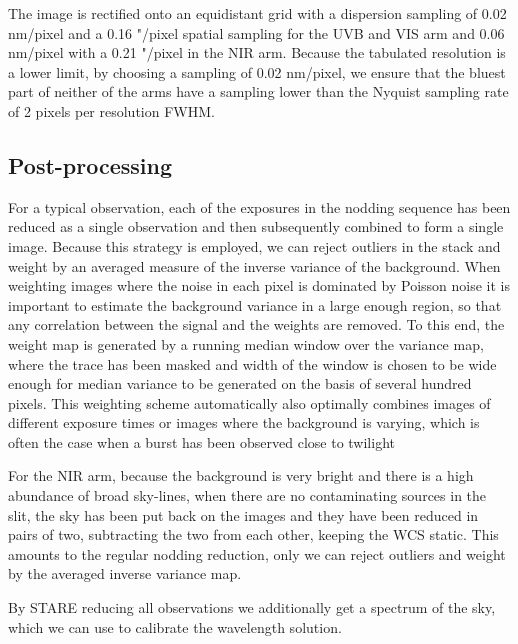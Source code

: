 \documentclass{aa}    %
\begin{document}
The image is rectified onto an equidistant grid with a dispersion sampling of
0.02 nm/pixel and a 0.16 "/pixel spatial sampling for the UVB and VIS arm and
0.06 nm/pixel with a 0.21 "/pixel in the NIR arm.  Because the tabulated
resolution is a lower limit, by choosing a sampling of 0.02 nm/pixel, we ensure
that the bluest part of neither of the arms have a sampling lower than the
Nyquist sampling rate of 2 pixels per resolution FWHM.

\subsection{Post-processing} \label{postproc}

For a typical observation, each of the exposures in the nodding sequence has
been reduced as a single observation and then subsequently combined to form a
single image. Because this strategy is employed, we can reject outliers in the
stack and weight by an averaged measure of the inverse variance of the
background. When weighting images where the noise in each pixel is dominated by
Poisson noise it is important to estimate the background variance in a large enough
region, so that any correlation between the signal and the weights are removed.
To this end, the weight map is generated by a running median window over the
variance map, where the trace has been masked and width of the window is chosen
to be wide enough for median variance to be generated on the basis of several
hundred pixels. This weighting scheme automatically also optimally combines
images of different exposure times or images where the background is varying,
which is often the case when a burst has been observed close to twilight

For the NIR arm, because the background is very bright and there is a high
abundance of broad sky-lines, when there are no contaminating sources in the
slit, the sky has been put back on the images and they have been reduced in
pairs of two, subtracting the two from each other, keeping the WCS static. This
amounts to the regular nodding reduction, only we can reject outliers and weight
by the averaged inverse variance map.

By STARE reducing all observations we additionally get a spectrum of the sky,
which we can use to calibrate the wavelength solution.


\end{document}
